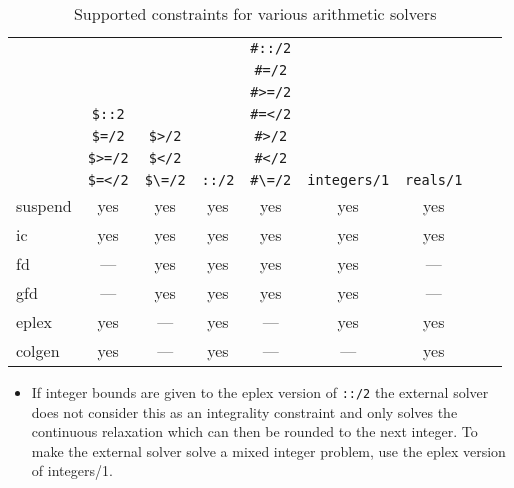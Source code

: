 \begin{table}
\begin{center}
\begin{toimage}
\begin{tabular}{|l||c|c|c|c|c|c|c|c|}
\hline
       &              &              &             & \verb'#::/2' &                   & \\
       &              &              &             & \verb'#=/2'  &                   & \\
       &              &              &             & \verb'#>=/2' &                   & \\
       & \verb'$::2'  &              &             & \verb'#=</2' &                   & \\
       & \verb'$=/2'  & \verb'$>/2'  &             & \verb'#>/2'  &                   & \\
       & \verb'$>=/2' & \verb'$</2'  &             & \verb'#</2'  &                   & \\
       & \verb'$=</2' & \verb'$\=/2' & \verb'::/2' & \verb'#\=/2' & \verb'integers/1' & \verb'reals/1' \\
\hline
\hline
suspend	& yes & yes & yes & yes & yes & yes \\
\hline                          
ic	& yes & yes & yes & yes & yes & yes \\
\hline                          
fd	& --- & yes & yes & yes & yes & --- \\
\hline                          
gfd	& --- & yes & yes & yes & yes & --- \\
\hline                          
eplex	& yes & --- & yes & --- & yes & yes \\
\hline                          
colgen	& yes & --- & yes & --- & --- & yes \\
\hline                          
\hline
\end{tabular}
\end{toimage}\imageflush
\end{center}
{\small
    \begin{itemize}
    \item If integer bounds are given to the eplex version of \verb'::/2' 
    the external solver does not consider this as an integrality constraint
    and only solves the continuous relaxation which can then be rounded
    to the next integer.  To make the external solver solve a mixed
    integer problem, use the eplex version of integers/1.
    \end{itemize}
}
\caption{Supported constraints for various arithmetic solvers}
\label{commoncons}
\end{table}
